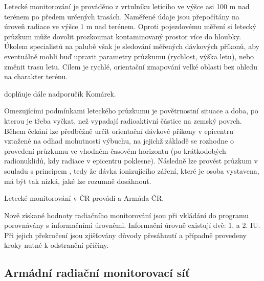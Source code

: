\begin{itemize}
  Letecké monitorování je prováděno z vrtulníku letícího ve výšce asi
  100 m nad terénem po předem určených trasách. Naměřené údaje jsou
  přepočítány na úroveň radiace ve výšce 1 m nad terénem. Oproti
  pojezdovému měření si letecký průzkum může dovolit prozkoumat
  kontaminovaný prostor více do hloubky. Úkolem specialistů na palubě
  však je sledování měřených dávkových příkonů, aby eventuálně mohli
  buď upravit parametry průzkumu (rychlost, výška letu), nebo změnit
  trasu letu. Cílem je rychlé, orientační zmapování velké oblasti bez
  ohledu na charakter terénu.
	
   doplňuje dále nadporučík
  Komárek.
	
  Omezujícími podmínkami leteckého průzkumu je povětrnostní situace a
  doba, po kterou je třeba vyčkat, než vypadají radioaktivní částice
  na zemský povrch. Během čekání lze předběžně určit orientační
  dávkové příkony v epicentru vztažené na odhad mohutnosti výbuchu, na
  jejichž základě se rozhodne o provedení průzkumu ve vhodném časovém
  horizontu (po  krátkodobých radionuklidů, kdy radiace v
  epicentru poklesne). Následně lze provést průzkum v souladu s
  principem , tedy že dávka ionizujícího záření, které je
  osoba vystavena, má být tak nízká, jaké lze rozumně dosáhnout.
	
  Letecké monitorování v ČR provádí  a Armáda ČR.

\end{itemize}
	
Nově získané hodnoty radiačního monitorování jsou při vkládání do
programu  porovnávány s informačními úrovněmi. Informační
úrovně existují dvě: 1. a 2. IU. Při jejich překročení jsou zjišťovány
důvody přesáhnutí a případně provedeny kroky nutné k odstranění
příčiny.
	
\subsection{Armádní radiační monitorovací síť}	
	
	
